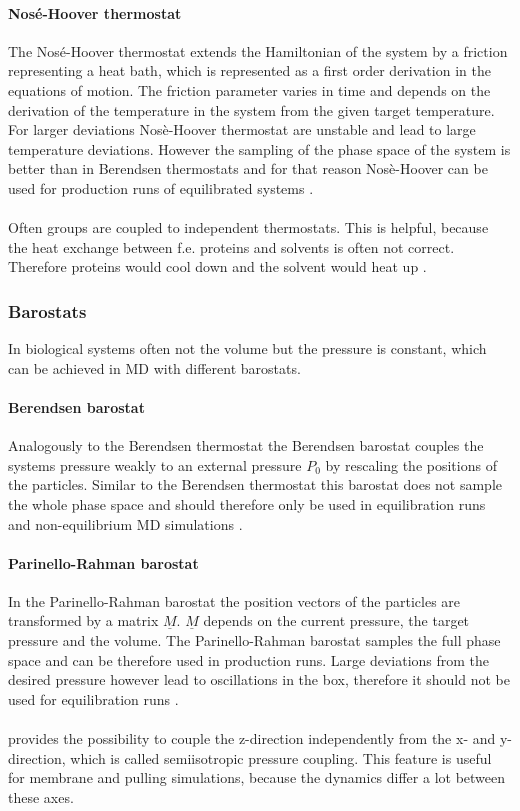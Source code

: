 \paragraph{Nosé-Hoover thermostat}
The Nosé-Hoover thermostat \autocites{nosehooverthermo}{nosehooverthermo2} extends the Hamiltonian of the system by a friction representing a heat bath, which is represented as a first order derivation in the equations of motion. The friction parameter varies in time and depends on the derivation of the temperature in the system from the given target temperature. For larger deviations Nosè-Hoover thermostat are unstable and lead to large temperature deviations. However the sampling of the phase space of the system is better than in Berendsen thermostats and for that reason Nosè-Hoover can be used for production runs of equilibrated systems \autocite[p. 32f]{gromacsManual}.\\
\\
Often groups are coupled to independent thermostats. This is helpful, because the heat exchange between f.e. proteins and solvents is often not correct. Therefore proteins would cool down and the solvent would heat up \autocite[p. 34]{gromacsManual}.
\subsubsection{Barostats}
In biological systems often not the volume but the pressure is constant, which can be achieved in MD with different barostats.
\paragraph{Berendsen barostat}
Analogously to the Berendsen thermostat the Berendsen barostat \autocite{berendsen} couples the systems pressure weakly to an external pressure $P_0$ by rescaling the positions of the particles. Similar to the Berendsen thermostat this barostat does not sample the whole phase space and should therefore only be used in equilibration runs and non-equilibrium MD simulations \autocite[p. 36]{gromacsManual}.
\paragraph{Parinello-Rahman barostat}
In the Parinello-Rahman barostat \autocites{parinelloBarostat}{parinelloBarostat2} the position vectors of the particles are transformed by a matrix $\underline{M}$. $\underline{M}$ depends on the current pressure, the target pressure and the volume. The Parinello-Rahman barostat samples the full phase space and can be therefore used in production runs. Large deviations from the desired pressure however lead to oscillations in the box, therefore it should not be used for equilibration runs \autocite[p. 36]{gromacsManual}.\\
\\
\gromacs{} provides the possibility to couple the z-direction independently from the x- and y-direction, which is called semiisotropic pressure coupling. This feature is useful for membrane and pulling simulations, because the dynamics differ a lot between these axes.



